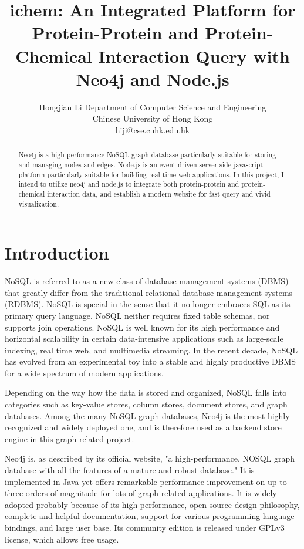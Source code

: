 \documentclass[10pt,conference,compsocconf]{../IEEEtran}
\begin{document}
\title{ichem: An Integrated Platform for Protein-Protein and Protein-Chemical Interaction Query with Neo4j and Node.js}
\author
{
\IEEEauthorblockN
{
Hongjian Li
\IEEEauthorblockA
{
Department of Computer Science and Engineering\\
Chinese University of Hong Kong\\
hiji@cse.cuhk.edu.hk
}
}
}
\maketitle

\begin{abstract}

Neo4j is a high-performance NoSQL graph database particularly suitable for storing and managing nodes and edges. Node.js is an event-driven server side javascript platform particularly suitable for building real-time web applications. In this project, I intend to utilize neo4j and node.js to integrate both protein-protein and protein-chemical interaction data, and establish a modern website for fast query and vivid visualization.

\end{abstract}

\section{Introduction}

NoSQL is referred to as a new class of database management systems (DBMS) that greatly differ from the traditional relational database management systems (RDBMS). NoSQL is special in the sense that it no longer embraces SQL as its primary query language. NoSQL neither requires fixed table schemas, nor supports join operations. NoSQL is well known for its high performance and horizontal scalability in certain data-intensive applications such as large-scale indexing, real time web, and multimedia streaming. In the recent decade, NoSQL has evolved from an experimental toy into a stable and highly productive DBMS for a wide spectrum of modern applications.

Depending on the way how the data is stored and organized, NoSQL falls into categories such as key-value stores, column stores, document stores, and graph databases. Among the many NoSQL graph databases, Neo4j \citep{1076} is the most highly recognized and widely deployed one, and is therefore used as a backend store engine in this graph-related project.

Neo4j is, as described by its official website, "a high-performance, NOSQL graph database with all the features of a mature and robust database." It is implemented in Java yet offers remarkable performance improvement on up to three orders of magnitude for lots of graph-related applications. It is widely adopted probably because of its high performance, open source design philosophy, complete and helpful documentation, support for various programming language bindings, and large user base. Its community edition is released under GPLv3 license, which allows free usage.
\end{document}
